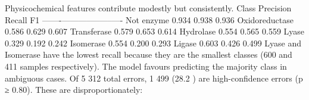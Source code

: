 \markdownRendererUlItem Physicochemical features contribute modestly but consistently.\markdownRendererUlItemEnd 
\markdownRendererUlEndTight \markdownRendererInterblockSeparator
{}
\markdownRendererSectionEnd \markdownRendererSectionBegin
{}\markdownRendererInterblockSeparator
{}\markdownRendererPipe{} Class \markdownRendererPipe{} Precision \markdownRendererPipe{} Recall \markdownRendererPipe{} F1 \markdownRendererPipe{}\markdownRendererSoftLineBreak
{}\markdownRendererPipe{}-------\markdownRendererPipe{}-----------\markdownRendererPipe{}--------\markdownRendererPipe{}----\markdownRendererPipe{}\markdownRendererSoftLineBreak
{}\markdownRendererPipe{} Not enzyme \markdownRendererPipe{} 0.934 \markdownRendererPipe{} 0.938 \markdownRendererPipe{} 0.936 \markdownRendererPipe{}\markdownRendererSoftLineBreak
{}\markdownRendererPipe{} Oxidoreductase \markdownRendererPipe{} 0.586 \markdownRendererPipe{} 0.629 \markdownRendererPipe{} 0.607 \markdownRendererPipe{}\markdownRendererSoftLineBreak
{}\markdownRendererPipe{} Transferase \markdownRendererPipe{} 0.579 \markdownRendererPipe{} 0.653 \markdownRendererPipe{} 0.614 \markdownRendererPipe{}\markdownRendererSoftLineBreak
{}\markdownRendererPipe{} Hydrolase \markdownRendererPipe{} 0.554 \markdownRendererPipe{} 0.565 \markdownRendererPipe{} 0.559 \markdownRendererPipe{}\markdownRendererSoftLineBreak
{}\markdownRendererPipe{} Lyase \markdownRendererPipe{} 0.329 \markdownRendererPipe{} 0.192 \markdownRendererPipe{} 0.242 \markdownRendererPipe{}\markdownRendererSoftLineBreak
{}\markdownRendererPipe{} Isomerase \markdownRendererPipe{} 0.554 \markdownRendererPipe{} 0.200 \markdownRendererPipe{} 0.293 \markdownRendererPipe{}\markdownRendererSoftLineBreak
{}\markdownRendererPipe{} Ligase \markdownRendererPipe{} 0.603 \markdownRendererPipe{} 0.426 \markdownRendererPipe{} 0.499 \markdownRendererPipe{}\markdownRendererParagraphSeparator
{}Lyase and Isomerase have the lowest recall because they are the smallest classes\markdownRendererSoftLineBreak
{}(600 and 411 samples respectively). The model favours predicting the majority class in\markdownRendererSoftLineBreak
{}ambiguous cases.\markdownRendererInterblockSeparator
{}
\markdownRendererSectionEnd \markdownRendererSectionBegin
{}\markdownRendererInterblockSeparator
{}Of 5 312 total errors, 1 499 (28.2 \markdownRendererPercentSign{}) are high-confidence errors (p ≥ 0.80). These are\markdownRendererSoftLineBreak
{}disproportionately:\markdownRendererInterblockSeparator
